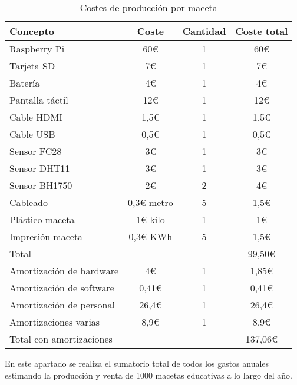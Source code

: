             \begin{table}[H]
                \centering
                \caption{Costes de producción por maceta}
                \begin{tabular}{|l|c|c|c|}
                    \hline
                    Concepto & Coste & Cantidad & Coste total \\
                    \hline
                    Raspberry Pi & 60€ & 1 & 60€ \\
                    Tarjeta SD & 7€ & 1 & 7€ \\
                    Batería & 4€ & 1 & 4€ \\
                    Pantalla táctil & 12€ & 1 & 12€ \\
                    Cable HDMI & 1,5€ & 1 & 1,5€ \\
                    Cable USB & 0,5€ & 1 & 0,5€ \\
                    Sensor FC28 & 3€ & 1 & 3€ \\
                    Sensor DHT11 & 3€ & 1 & 3€ \\
                    Sensor BH1750 & 2€ & 2 & 4€ \\
                    Cableado & 0,3€ metro & 5 & 1,5€ \\
                    Plástico maceta & 1€ kilo & 1 & 1€ \\
                    Impresión maceta & 0,3€ KWh & 5 & 1,5€ \\
                    \hline
                    Total & & & 99,50€ \\
                    \hline
                    Amortización de hardware & 4€ & 1 & 1,85€ \\
                    Amortización de software & 0,41€ & 1 & 0,41€ \\
                    Amortización de personal & 26,4€ & 1 & 26,4€ \\
                    Amortizaciones varias & 8,9€ & 1 & 8,9€ \\
                    \hline
                    Total con amortizaciones & & & 137,06€ \\
                    \hline
                \end{tabular}
            \end{table}
            En este apartado se realiza el sumatorio total de todos los gastos anuales estimando la producción y venta de 1000 macetas educativas a lo largo del año.
